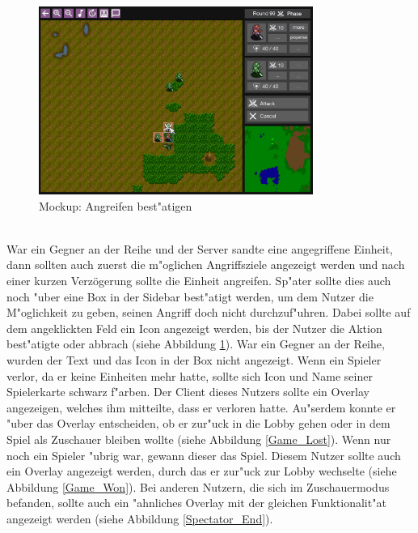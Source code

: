 \documentclass[12pt, titlepage]{scrartcl}
\newcounter{subsubsubsection}[subsubsection]
\begin{document}
			        \begin{figure}[H] 
    				    \centering
    				    \includegraphics[width=0.8\textwidth]{images/mockups/Attack.png}
    				    \caption{Mockup: Angreifen best"atigen}
    				    \label{Attack}
			        \end{figure}
		        	\ \\ War ein Gegner an der Reihe und der Server sandte eine angegriffene Einheit, dann sollten auch zuerst die m"oglichen Angriffsziele angezeigt werden und nach einer kurzen Verz\"ogerung sollte die Einheit angreifen. Sp"ater sollte dies auch noch "uber eine Box in der Sidebar best"atigt werden, um dem Nutzer die M"oglichkeit zu geben, seinen Angriff doch nicht durchzuf"uhren. Dabei sollte auf dem angeklickten Feld ein Icon angezeigt werden, bis der Nutzer die Aktion best"atigte oder abbrach (siehe Abbildung \ref{Attack}). War ein Gegner an der Reihe, wurden der Text und das Icon in der Box nicht angezeigt.
			        Wenn ein Spieler verlor, da er keine Einheiten mehr hatte, sollte sich Icon und Name seiner Spielerkarte schwarz f"arben. Der Client dieses Nutzers sollte ein Overlay angezeigen, welches ihm mitteilte, dass er verloren hatte. Au"serdem konnte er "uber das Overlay entscheiden, ob er zur"uck in die Lobby gehen oder in dem Spiel als Zuschauer bleiben wollte (siehe Abbildung \ref{Game_Lost}). Wenn nur noch ein Spieler "ubrig war, gewann dieser das Spiel. Diesem Nutzer sollte auch ein Overlay angezeigt werden, durch das er zur"uck zur Lobby wechselte (siehe Abbildung \ref{Game_Won}). Bei anderen Nutzern, die sich im Zuschauermodus befanden, sollte auch ein "ahnliches Overlay mit der gleichen Funktionalit"at angezeigt werden (siehe Abbildung \ref{Spectator_End}).
\end{document}
